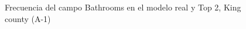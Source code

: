 \begin{figure}[H]
    \centering
    
    \caption{Frecuencia del campo Bathrooms en el modelo real y Top 2, King county (A-1)}
    \label{frecuency-top2-bathrooms}
\end{figure}